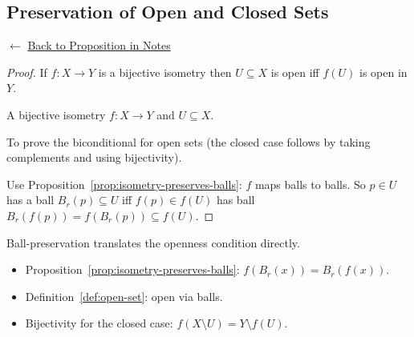 
\subsection*{Preservation of Open and Closed Sets}
\label{prf:isometry-preserves-open}

\begin{remark*}[Return]
$\leftarrow$ \hyperref[prop:isometry-preserves-open]{Back to Proposition in Notes}
\end{remark*}

\begin{proof}
\Claim If $f : X \to Y$ is a bijective isometry then $U \subseteq X$ is
open iff $f(U)$ is open in $Y$.

\Given A bijective isometry $f : X \to Y$ and $U \subseteq X$.

\Goal To prove the biconditional for open sets (the closed case follows by
taking complements and using bijectivity).

\Strategy Use Proposition~\ref{prop:isometry-preserves-balls}:
$f$ maps balls to balls.
So $p \in U$ has a ball $B_r(p) \subseteq U$ iff $f(p) \in f(U)$ has
ball $B_r(f(p)) = f(B_r(p)) \subseteq f(U)$.


\end{proof}

\begin{remark*}
Ball-preservation translates the openness condition directly.
\end{remark*}

\begin{remark*}[Dependencies]
\begin{itemize}
  \item Proposition~\ref{prop:isometry-preserves-balls}: $f(B_r(x)) = B_r(f(x))$.
  \item Definition~\ref{def:open-set}: open via balls.
  \item Bijectivity for the closed case: $f(X \setminus U) = Y \setminus f(U)$.
\end{itemize}
\end{remark*}
